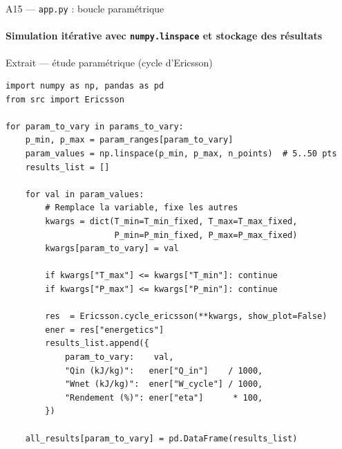 \documentclass[aspectratio=43, 10pt]{beamer}
\begin{document}
\begin{frame}[fragile]{A15 --- \texttt{app.py} : boucle param\'etrique}
  \framesubtitle{Simulation it\'erative avec \texttt{numpy.linspace} et stockage des r\'esultats}

  \begin{exampleblock}{Extrait --- \'etude param\'etrique (cycle d'Ericsson)}
  \begin{lstlisting}
import numpy as np, pandas as pd
from src import Ericsson

for param_to_vary in params_to_vary:
    p_min, p_max = param_ranges[param_to_vary]
    param_values = np.linspace(p_min, p_max, n_points)  # 5..50 pts
    results_list = []

    for val in param_values:
        # Remplace la variable, fixe les autres
        kwargs = dict(T_min=T_min_fixed, T_max=T_max_fixed,
                      P_min=P_min_fixed, P_max=P_max_fixed)
        kwargs[param_to_vary] = val

        if kwargs["T_max"] <= kwargs["T_min"]: continue
        if kwargs["P_max"] <= kwargs["P_min"]: continue

        res  = Ericsson.cycle_ericsson(**kwargs, show_plot=False)
        ener = res["energetics"]
        results_list.append({
            param_to_vary:    val,
            "Qin (kJ/kg)":   ener["Q_in"]    / 1000,
            "Wnet (kJ/kg)":  ener["W_cycle"] / 1000,
            "Rendement (%)": ener["eta"]      * 100,
        })

    all_results[param_to_vary] = pd.DataFrame(results_list)
  \end{lstlisting}
  \end{exampleblock}

\end{frame}
\end{document}

